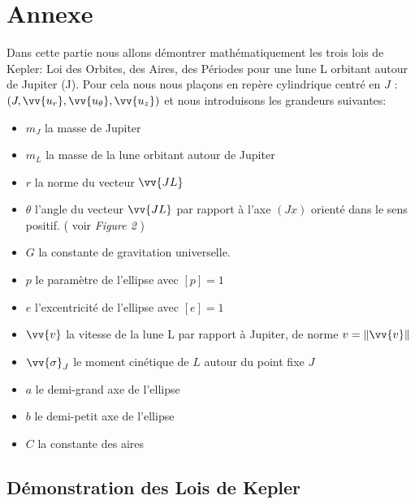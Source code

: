\documentclass{aa}
\begin{document}
\newpage
\section{Annexe}

Dans cette partie nous allons démontrer mathématiquement les trois lois de Kepler: Loi des Orbites, des Aires, des Périodes pour une lune L orbitant autour de Jupiter (J).  Pour cela nous nous plaçons en repère cylindrique centré en $J$ : $\left(J, \vv{u_r}, \vv{u_\theta}, \vv{u_z}\right)$ et nous introduisons les grandeurs suivantes: 

\begin{itemize}
    \item $m_J$ la masse de Jupiter \\
    \item $m_L$ la masse de la lune orbitant autour de Jupiter \\ 
    \item $r$ la norme du vecteur $\vv{JL}$ \\
    \item $\theta$ l'angle du vecteur $\vv{JL}$ par rapport à l'axe $\left(Jx\right)$ orienté dans le sens positif. ( voir \emph{Figure 2} ) \\
    \item $G$ la constante de gravitation universelle. \\
    \item $p$ le paramètre de l'ellipse avec $\left[p\right] = 1 $ \\
    \item $e$ l'excentricité de l'ellipse avec $\left[e\right] = 1 $ \\
    \item $\vv{v}$ la vitesse de la lune L par rapport à Jupiter, de norme $v = \| \vv{v} \|$ \\
    \item $\vv{\sigma}_J$ le moment cinétique de $L$ autour du point fixe $J$ \\
    \item $a$ le demi-grand axe de l'ellipse \\
    \item $b$ le demi-petit axe de l'ellipse  \\
    \item $C$ la constante des aires \\
\end{itemize}


\subsection{Démonstration des Lois de Kepler}
\end{document}
